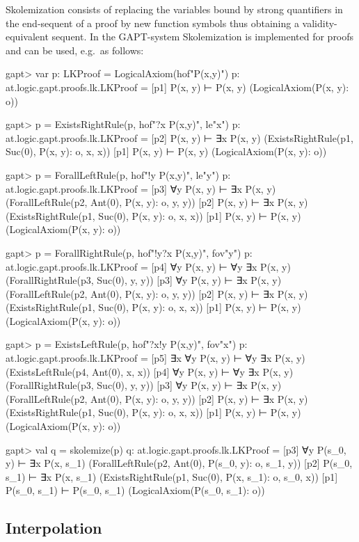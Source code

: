 \documentclass[a4paper,11pt]{article}
\begin{document}
Skolemization consists of replacing the variables bound by strong quantifiers in the end-sequent of a proof
by new function symbols thus obtaining a validity-equivalent sequent. In the GAPT-system Skolemization
is implemented for proofs and can be used, e.g.~as follows:
%
\begin{clilisting}
gapt> var p: LKProof = LogicalAxiom(hof"P(x,y)")
p: at.logic.gapt.proofs.lk.LKProof =
[p1] P(x, y) ⊢ P(x, y)    (LogicalAxiom(P(x, y): o))

gapt> p = ExistsRightRule(p, hof"?x P(x,y)", le"x")
p: at.logic.gapt.proofs.lk.LKProof = [p2] P(x, y) ⊢ ∃x P(x, y)    (ExistsRightRule(p1, Suc(0), P(x, y): o, x, x))
[p1] P(x, y) ⊢ P(x, y)    (LogicalAxiom(P(x, y): o))

gapt> p = ForallLeftRule(p, hof"!y P(x,y)", le"y")
p: at.logic.gapt.proofs.lk.LKProof = [p3] ∀y P(x, y) ⊢ ∃x P(x, y)    (ForallLeftRule(p2, Ant(0), P(x, y): o, y, y))
[p2] P(x, y) ⊢ ∃x P(x, y)    (ExistsRightRule(p1, Suc(0), P(x, y): o, x, x))
[p1] P(x, y) ⊢ P(x, y)    (LogicalAxiom(P(x, y): o))

gapt> p = ForallRightRule(p, hof"!y?x P(x,y)", fov"y")
p: at.logic.gapt.proofs.lk.LKProof = [p4] ∀y P(x, y) ⊢ ∀y ∃x P(x, y)    (ForallRightRule(p3, Suc(0), y, y))
[p3] ∀y P(x, y) ⊢ ∃x P(x, y)    (ForallLeftRule(p2, Ant(0), P(x, y): o, y, y))
[p2] P(x, y) ⊢ ∃x P(x, y)    (ExistsRightRule(p1, Suc(0), P(x, y): o, x, x))
[p1] P(x, y) ⊢ P(x, y)    (LogicalAxiom(P(x, y): o))

gapt> p = ExistsLeftRule(p, hof"?x!y P(x,y)", fov"x")
p: at.logic.gapt.proofs.lk.LKProof = [p5] ∃x ∀y P(x, y) ⊢ ∀y ∃x P(x, y)    (ExistsLeftRule(p4, Ant(0), x, x))
[p4] ∀y P(x, y) ⊢ ∀y ∃x P(x, y)    (ForallRightRule(p3, Suc(0), y, y))
[p3] ∀y P(x, y) ⊢ ∃x P(x, y)    (ForallLeftRule(p2, Ant(0), P(x, y): o, y, y))
[p2] P(x, y) ⊢ ∃x P(x, y)    (ExistsRightRule(p1, Suc(0), P(x, y): o, x, x))
[p1] P(x, y) ⊢ P(x, y)    (LogicalAxiom(P(x, y): o))

gapt> val q = skolemize(p)
q: at.logic.gapt.proofs.lk.LKProof =
[p3] ∀y P(s_0, y) ⊢ ∃x P(x, s_1)    (ForallLeftRule(p2, Ant(0), P(s_0, y): o, s_1, y))
[p2] P(s_0, s_1) ⊢ ∃x P(x, s_1)    (ExistsRightRule(p1, Suc(0), P(x, s_1): o, s_0, x))
[p1] P(s_0, s_1) ⊢ P(s_0, s_1)    (LogicalAxiom(P(s_0, s_1): o))

\end{clilisting}


\subsection{Interpolation}
\end{document}
